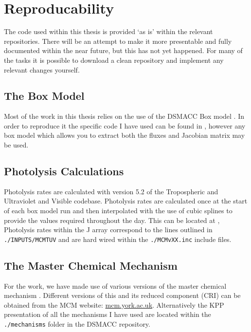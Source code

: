 \newpage

\section*{Reproducability}
%

The code used within this thesis is provided `as is' within the relevant repositories. There will be an attempt to make it more presentable and fully documented within the near future, but this has not yet happened. For many of the tasks it is possible to download a clean repository and implement any relevant changes yourself.

\subsection*{The Box Model}

Most of the work in this thesis relies on the use of the DSMACC Box model \citep{dsmacc}. In order to reproduce it the specific code I have used can be found in \citep{dsmaccgit}, however any box model which allows you to extract both the fluxes and Jacobian matrix may be used.

\subsection*{Photolysis Calculations}

Photolysis rates are calculated with version 5.2 of the Tropospheric and Ultraviolet and Visible codebase. Photolysis rates are calculated once at the start of each box model run and then interpolated with the use of cubic splines to provide the values required throughout the day. This can be located at \citep{tuv}, Photolysis rates within the J array correspond to the lines outlined in \verb|./INPUTS/MCMTUV| and are hard wired within the \verb|./MCMvXX.inc| include files.

\subsection*{The Master Chemical Mechanism}
For the work, we have made use of various versions of the master chemical mechanism \citep{mcm}. Different versions of this and its reduced component (CRI) can be obtained from the MCM website: \url{mcm.york.ac.uk}. Alternatively the KPP presentation of all the mechanisms I have used are located within the \verb|./mechanisms| folder in the DSMACC repository.


